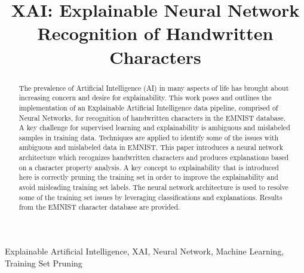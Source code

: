 \documentclass[conference]{IEEEtran}
\begin{document}
\title{
    XAI: Explainable Neural Network Recognition of Handwritten Characters
}

\author{
\and
{}
\and
{}
}

\maketitle

\begin{abstract}
    The prevalence of Artificial Intelligence (AI) in many aspects of life has
    brought about increasing concern and desire for explainability.  This work poses
    and outlines the implementation of an Explainable Artificial Intelligence data
    pipeline, comprised of Neural Networks, for recognition of handwritten
    characters in the EMNIST database. A key challenge for supervised learning and
    explainability is ambiguous and mislabeled samples in training data.  Techniques
    are applied to identify some of the issues with ambiguous and mislabeled data in
    EMNIST.  This paper introduces a neural network architecture which recognizes
    handwritten characters and produces explanations based on a character property
    analysis.  A key concept to explainability that is introduced here is correctly
    pruning the training set in order to improve the explainability and avoid
    misleading training set labels. The neural network architecture is used to
    resolve some of the training set issues by leveraging classifications and
    explanations. Results from the EMNIST character database are provided.
\end{abstract}

\begin{IEEEkeywords}
    Explainable Artificial Intelligence, XAI, Neural Network, Machine Learning, Training Set Pruning
\end{IEEEkeywords}
\end{document}
